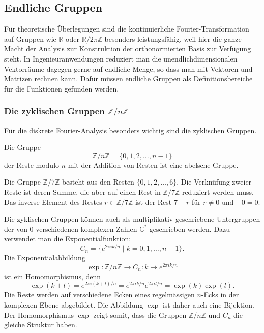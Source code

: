 %
%
%

%
%
\subsection{Endliche Gruppen
\label{buch:gruppen:subsection:endliche-gruppen}}
Für theoretische Überlegungen sind die kontinuierliche
Fourier-Transformation auf Gruppen wie $\mathbb{R}$ oder
$\mathbb{R}/2\pi\mathbb{Z}$ besonders leistungsfähig, weil hier die
ganze Macht der Analysis zur Konstruktion der orthonormierten Basis
zur Verfügung steht.
In Ingenieuranwendungen reduziert man die unendlichdimensionalen
Vektorräume dagegen gerne auf endliche Menge, so dass man mit
Vektoren und Matrizen rechnen kann.
Dafür müssen endliche Gruppen als Definitionsbereiche für die Funktionen
gefunden werden.

%
%
\subsubsection{Die zyklischen Gruppen $\mathbb{Z}/n\mathbb{Z}$}
Für die diskrete Fourier-Analysis besonders wichtig sind die zyklischen
Gruppen.

\begin{definition}
\label{buch:gruppen:endliche-gruppen:def:zyklisch}
Die Gruppe
\[
\mathbb{Z}/n\mathbb{Z}
=
\{0,1,2,\dots,n-1\}
\]
der Reste modulo $n$ mit der Addition von Resten ist eine abelsche
Gruppe.
\end{definition}

\begin{beispiel}
Die Gruppe $\mathbb{Z}/7\mathbb{Z}$ besteht aus den Resten
$\{0,1,2,\dots,6\}$.
Die Verknüfung zweier Reste ist deren Summe, die aber auf einen
Rest in $\mathbb{Z}/7\mathbb{Z}$ reduziert werden muss.
Das inverse Element des Restes $r\in\mathbb{Z}/7\mathbb{Z}$
ist der Rest $7-r$ für $r\ne 0$ und $-0=0$.
\end{beispiel}

Die zyklischen Gruppen können auch als multiplikativ geschriebene
Untergruppen der von $0$ verschiedenen komplexen Zahlen $\mathbb{C}^*$
geschrieben werden.
Dazu verwendet man die Exponentialfunktion:
\[
C_n
=
\{ e^{2\pi ik/n}\mid k=0,1,\dots,n-1\}.
\]
Die Exponentialabbildung
\[
\exp
\colon
\mathbb{Z}/n\mathbb{Z}
\to
C_n
:
k\mapsto e^{2\pi ik/n}
\]
ist ein Homomorphismus, denn
\[
\exp(k+l)
=
e^{2\pi i(k+l)/n}
=
e^{2\pi ik/n}
e^{2\pi il/n}
=
\exp(k)\exp(l).
\]
Die Reste werden auf verschiedene Ecken eines regelmässigen
$n$-Ecks in der komplexen Ebene abgebildet.
Die Abbildung $\exp$ ist daher auch eine Bijektion.
Der Homomorphismus $\exp$ zeigt somit, dass die Gruppen
$\mathbb{Z}/n\mathbb{Z}$ und $C_n$ die gleiche Struktur haben.

